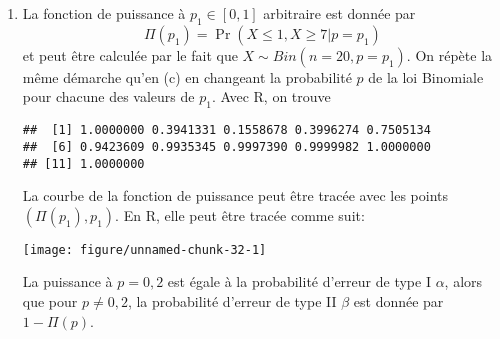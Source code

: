 \begin{solution}{6.1}
\begin{enumerate}
\item La fonction de puissance à $p_1\in [0,1]$ arbitraire est donnée par
$$
\Pi(p_1) = \Pr(X  \le 1, X \ge 7  |  p =p_1)
$$
et peut être calculée par le fait que $X \sim Bin(n=20, p=p_1)$. On répète la même démarche qu'en (c) en changeant la probabilité $p$ de la loi Binomiale pour chacune des valeurs de $p_1$. Avec \textsf{R}, on trouve
\begin{knitrout}
\color{fgcolor}\begin{kframe}
\begin{alltt}
 \hlkwb{<-} \hlstd{(}\hlstd{=}\hlstd{,}\hlstd{=}\hlstd{,}\hlstd{=}\hlstd{)}
 \hlkwb{<-} \hlstd{(}\hlstd{,}\hlstd{=}\hlstd{,} \hlopt{+} \hlopt{-}\hlstd{(}\hlstd{,}\hlstd{=}\hlstd{,}
\end{alltt}
\begin{verbatim}
##  [1] 1.0000000 0.3941331 0.1558678 0.3996274 0.7505134
##  [6] 0.9423609 0.9935345 0.9997390 0.9999982 1.0000000
## [11] 1.0000000
\end{verbatim}
\end{kframe}
\end{knitrout}
La courbe de la fonction de puissance peut être tracée avec les points $(\Pi(p_1), p_1)$. En \textsf{R}, elle peut être tracée comme suit:
\begin{knitrout}
\color{fgcolor}\begin{kframe}
\begin{alltt}
\hlstd{=}\hlstd{)}
\hlstd{=}\hlstd{)}
\end{alltt}
\end{kframe}
\texttt{[image: figure/unnamed-chunk-32-1]}

\end{knitrout}
La puissance à $p=0,2$ est égale à la probabilité d'erreur de type I $\alpha$, alors que pour $ p \ne 0,2$, la probabilité d'erreur de type II $\beta$ est donnée par $1 - \Pi(p)$.


\end{enumerate}
\end{solution}
